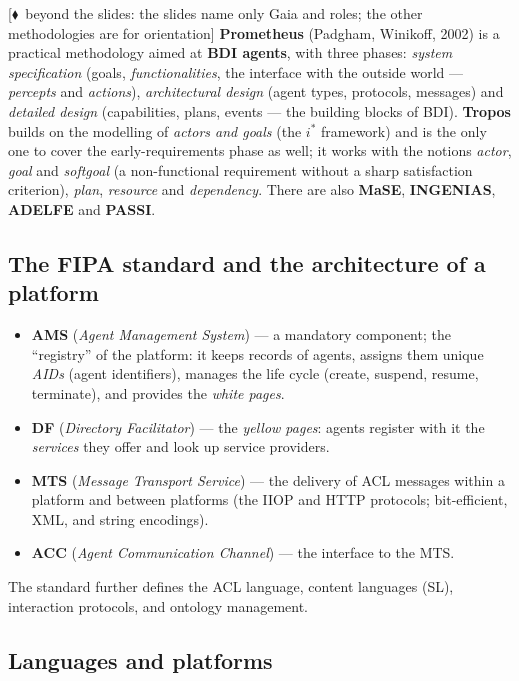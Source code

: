 \documentclass[11pt,a4paper]{article}
\theoremstyle{definition}
\providecommand{\uv}[1]{``#1''}
\newcommand{\mimoq}[1]{\textcolor{markcol}{\textsf{\footnotesize[$\blacklozenge$~beyond the slides: #1]}}}
\begin{document}
\noindent\mimoq{the slides name only Gaia and roles; the other methodologies are for
orientation}
\textbf{Prometheus} (Padgham, Winikoff, 2002) is a practical methodology aimed at \textbf{BDI
agents}, with three phases: \emph{system specification} (goals, \emph{functionalities}, the
interface with the outside world --- \emph{percepts} and \emph{actions}),
\emph{architectural design} (agent types, protocols, messages) and \emph{detailed design}
(capabilities, plans, events --- the building blocks of BDI). \textbf{Tropos} builds on the
modelling of \emph{actors and goals} (the $i^*$ framework) and is the only one to cover the
early-requirements phase as well; it works with the notions \emph{actor}, \emph{goal} and
\emph{softgoal} (a non-functional requirement without a sharp satisfaction criterion),
\emph{plan}, \emph{resource} and \emph{dependency}. There are also \textbf{MaSE},
\textbf{INGENIAS}, \textbf{ADELFE} and \textbf{PASSI}.

\subsection{The FIPA standard and the architecture of a platform}
\begin{defbox}
\begin{itemize}
\item \textbf{AMS} (\emph{Agent Management System}) --- a mandatory component; the \uv{registry} of the
  platform: it keeps records of agents, assigns them unique \emph{AIDs} (agent identifiers),
  manages the life cycle (create, suspend, resume, terminate), and provides the
  \emph{white pages}.
\item \textbf{DF} (\emph{Directory Facilitator}) --- the \emph{yellow pages}:
  agents register with it the \emph{services} they offer and look up service providers.
\item \textbf{MTS} (\emph{Message Transport Service}) --- the delivery of ACL messages within a
  platform and between platforms (the IIOP and HTTP protocols; bit-efficient, XML, and string
  encodings).
\item \textbf{ACC} (\emph{Agent Communication Channel}) --- the interface to the MTS.
\end{itemize}
The standard further defines the ACL language, content languages (SL), interaction protocols, and
ontology management.
\end{defbox}

\subsection{Languages and platforms}
\end{document}
